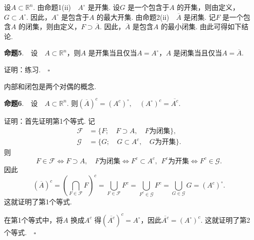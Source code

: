 \documentclass{article}
\begin{document}
\vspace{20pt}

\noindent 设\(A \subset \mathbb{R}^n\). 由命题1(ii)\ \ \(A^{ \circ }\) 是开集. 设\(G\) 是一个包含于\(A\) 的开集，则由定义，\(G \subset A^{ \circ }\). 因此，\(A^{ \circ }\) 是包含于\(A\) 的最大开集. 由命题2(ii)\ \ \(\overline{A}\) 是闭集. 记\(F\) 是一个包含\(A\) 的闭集，则由定义，\(F \supset \overline{A}\). 因此，\(\overline{A}\) 是包含\(A\) 的最小闭集. 由此可得如下结论.

\vspace{20pt}

\noindent \textbf{命题5}.\ \ 设\ \ \(A \subset \mathbb{R}^n\)，则\(A\) 是开集当且仅当\(A = A^{\circ }\)，\(A\) 是闭集当且仅当\(A = \overline{A}\).

\vspace{20pt}

\noindent 证明：练习.\(\quad \square \)

\newpage

\noindent 内部和闭包是两个对偶的概念.

\vspace{20pt}

\noindent \textbf{命题6}.\ \ 设\ \ \(A \subset \mathbb{R}^n\). 则\(\left(\overline{A}\right)^{c} =\left(A^{c}\right)^{\circ },\quad \left(A^{\circ }\right)^{c} = \overline{A^{c}}\).

\vspace{20pt}

\noindent 证明：首先证明第1个等式. 记
\begin{align*}
    \mathcal{F} &= \{F;\quad F \supset A,\quad F\text{为闭集}\}, \\
    \mathcal{G} &= \{G;\quad G \subset A^{c},\quad G\text{为开集}\}.
\end{align*}
则
\begin{equation*}
    F \in \mathcal{F} \iff F \supset A,\quad F\text{为闭集} \iff F^{c} \subset A^{c},\ \ F^{c}\text{为开集} \iff F^{c} \in \mathcal{G}.
\end{equation*}
因此
\begin{equation*}
    \left(\overline{A}\right)^{c} =\left(\bigcap_{F \in \mathcal{F}}F\right)^{c} = \bigcup_{F \in \mathcal{F}}F^{c} = \bigcup_{F^c \in \mathcal{G}}F^c = \bigcup_{G \in \mathcal{G}}G =\left(A^c\right)^{\circ }.
\end{equation*}
这就证明了第1个等式.

\vspace{20pt}

\noindent 在第1个等式中，将\(A\) 换成\(A^c\) 得\(\left(\overline{A^c}\right)^{c} = A^{\circ }\)，因此\(\overline{A^c} = (A^{\circ })^{c}\). 这就证明了第2个等式.\(\quad \square\)
\end{document}
